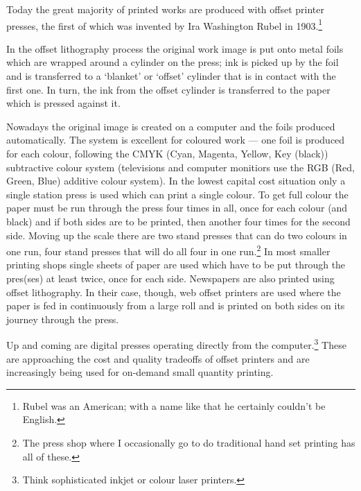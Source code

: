 \documentclass[10pt,a4paper,oneside,extrafontsizes]{memoir}%
\begin{document}
\begin{paracol}{2}
\switchEng
    Today the great majority of printed works are produced with 
offset printer presses, the first of which was
invented by Ira Washington Rubel in 
1903.\footnote{Rubel was an American; with a name like that he certainly
couldn't be English.}

    In the offset lithography process the original work image is put 
onto metal foils which 
are wrapped around a cylinder on the press; ink is picked up by the foil 
and is transferred to a `blanket' or `offset' cylinder that is in contact
with the first one. In turn, the ink from the offset cylinder is 
transferred to the paper which is pressed against it.

    Nowadays the original image is created on a computer and the foils
produced automatically. The system is excellent for coloured work --- one foil
is produced for each colour, following the CMYK
(Cyan, Magenta, Yellow, Key (black)) subtractive colour system 
(televisions and computer monitiors use the RGB (Red, Green, Blue) 
additive colour system). In the lowest capital cost situation only a
single station press is used which can print a single colour. To get full
colour the paper must be run through the press four times in all, once for
each colour (and black) and if both sides are to be printed, then another
four times for the second side. Moving up
the scale there are two stand presses that can do two colours in one run,
four stand presses that will do all four in one run.\footnote{The press shop
where I occasionally go to do traditional hand set printing has all of these.} 
In most
smaller printing shops single sheets of paper are used which have to be put 
through the pres(ses) at least twice, once for each side. Newspapers are
also printed using offset lithography. In their case, though, web offset
printers are used where the paper is fed in continuously from a large roll and
is printed on both sides on its journey through the press.

    Up and coming are digital presses operating directly from the 
computer.\footnote{Think sophisticated inkjet or colour laser printers.}
These are approaching the cost and quality tradeoffs of offset printers
and are increasingly being used for on-demand small quantity printing. 


\end{paracol}
\end{document}
